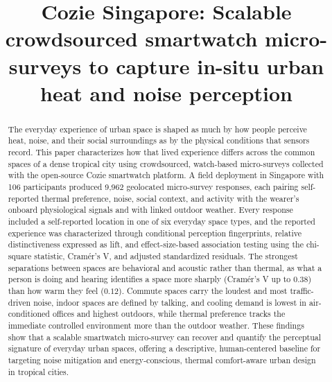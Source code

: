 \documentclass[]{interact}
\begin{document}

\title{Cozie Singapore: Scalable crowdsourced smartwatch micro-surveys to capture in-situ urban heat and noise perception}

\author{
}

\maketitle

\begin{abstract}
The everyday experience of urban space is shaped as much by how people perceive heat, noise, and their social surroundings as by the physical conditions that sensors record. This paper characterizes how that lived experience differs across the common spaces of a dense tropical city using crowdsourced, watch-based micro-surveys collected with the open-source Cozie smartwatch platform. A field deployment in Singapore with 106 participants produced 9{,}962 geolocated micro-survey responses, each pairing self-reported thermal preference, noise, social context, and activity with the wearer's onboard physiological signals and with linked outdoor weather. Every response included a self-reported location in one of six everyday space types, and the reported experience was characterized through conditional perception fingerprints, relative distinctiveness expressed as lift, and effect-size-based association testing using the chi-square statistic, Cram\'er's V, and adjusted standardized residuals. The strongest separations between spaces are behavioral and acoustic rather than thermal, as what a person is doing and hearing identifies a space more sharply (Cram\'er's V up to $0.38$) than how warm they feel ($0.12$). Commute spaces carry the loudest and most traffic-driven noise, indoor spaces are defined by talking, and cooling demand is lowest in air-conditioned offices and highest outdoors, while thermal preference tracks the immediate controlled environment more than the outdoor weather. These findings show that a scalable smartwatch micro-survey can recover and quantify the perceptual signature of everyday urban spaces, offering a descriptive, human-centered baseline for targeting noise mitigation and energy-conscious, thermal comfort-aware urban design in tropical cities.
\end{abstract}
\end{document}
